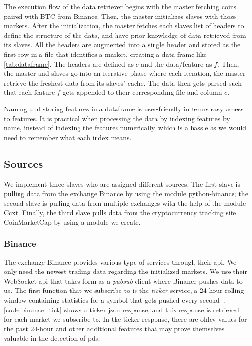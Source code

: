 The execution flow of the data retriever begins with the master fetching coins paired with BTC from Binance. Then, the master initializes slaves with those markets. After the initialization, the master fetches each slaves list of headers to define the structure of the data, and have prior knowledge of data retrieved from its slaves. All the headers are augmented into a single header and stored as the first row in a file that identifies a market, creating a data frame like \autoref{tab:dataframe}. The headers are defined as $c$ and the data/feature as $f$. Then, the master and slaves go into an iterative phase where each iteration, the master retrieve the freshest data from its slaves' cache. The data then gets parsed such that each feature $f$ gets appended to their corresponding file and column $c$.
 


Naming and storing features in a dataframe is user-friendly in terms easy access to features. It is practical when processing the data by indexing features by name, instead of indexing the features numerically, which is a hassle as we would need to remember what each index means.

\subsection{Sources}
We implement three slaves who are assigned different sources. The first slave is pulling data from the exchange Binance by using the module python-binance; the second slave is pulling data from multiple exchanges with the help of the module Ccxt. Finally, the third slave pulls data from the cryptocurrency tracking site CoinMarketCap by using a module we create.

\subsubsection{Binance}
The exchange Binance provides various type of services through their \ac{api}. We only need the newest trading data regarding the initialized markets. We use their WebSocket \ac{api} that takes form as a \emph{pubsub} client where Binance pushes data to us. The first function that we subscribe to is the \emph{ticker} service, a 24-hour rolling window containing statistics for a symbol that gets pushed every second~\cite{binance_git}. \autoref{code:binance_tick} shows a ticker \ac{json} response, and this response is retrieved for each market we subscribe to. In the ticker response, there are \ac{ohlcv} values for the past 24-hour and other additional features that may prove themselves valuable in the detection of \acp{pd}.

